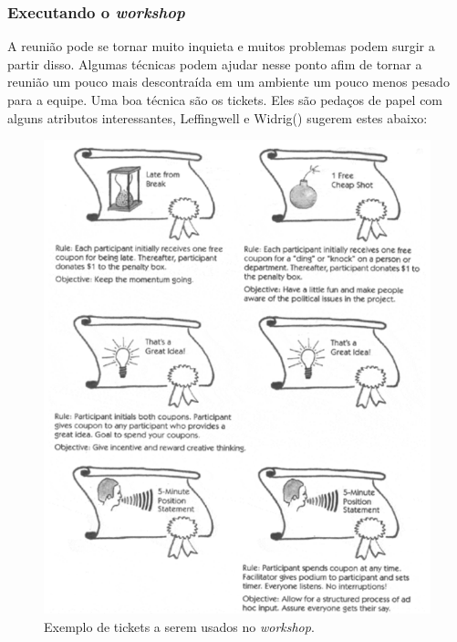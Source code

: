       \subsubsection{Executando o \textit{workshop}}
      
	A reunião pode se tornar muito inquieta e muitos problemas podem surgir a partir disso. 
	Algumas técnicas podem ajudar nesse ponto afim de tornar a reunião um pouco mais descontraída 
	em um ambiente um pouco menos pesado para a equipe. 
	Uma boa técnica são os tickets. Eles são pedaços de papel com alguns atributos interessantes, 
	Leffingwell e Widrig(\citeyear{leffingwell99}) sugerem estes abaixo:
	
	\begin{figure}[!htbp]
	  \centering
	  \includegraphics[scale=0.3]{editaveis/figuras/tickets}
	  \caption[Exemplo de tickets a serem usados no \textit{workshop}]
	    {Exemplo de tickets a serem usados no \textit{workshop}.\footnotemark}
	  \label{tickets}
	\end{figure}
	
